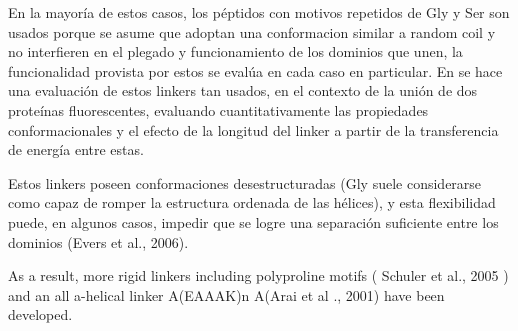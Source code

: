 En la mayoría de estos casos, los péptidos con motivos repetidos de Gly y Ser son usados porque se asume que adoptan una conformacion similar a random coil y no interfieren en el plegado y funcionamiento de los dominios que unen,
la funcionalidad provista por estos se evalúa en cada caso en particular.
En \cite{evers2006quantitative} se hace una evaluación de estos linkers tan usados, en el contexto de la unión de dos proteínas fluorescentes, evaluando cuantitativamente las propiedades conformacionales y el efecto de la longitud del linker 
a partir de la transferencia de energía entre estas.


Estos linkers poseen conformaciones desestructuradas (Gly suele considerarse como capaz de romper la estructura ordenada de las hélices), y esta flexibilidad puede, en algunos casos, impedir que se logre una separación 
suficiente entre los dominios (Evers et al., 2006).

As a result, more rigid linkers including polyproline motifs (
Schuler et al., 2005 ) and an all
a-helical linker A(EAAAK)n A(Arai
et al ., 2001) have been developed.




% 







